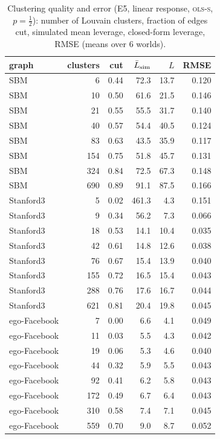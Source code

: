 \begin{table}[h]\centering\footnotesize
\caption{Clustering quality and error (E5, linear response, \textsc{ols-s}, $p=\frac12$): number of Louvain clusters, fraction of edges cut, simulated mean leverage, closed-form leverage, RMSE (means over 6 worlds).}
\label{tab:clu}\begin{tabular}{lrrrrr}\toprule
graph & clusters & cut & $\bar L_{\rm sim}$ & $L$ & RMSE \\
\midrule
SBM & 6 & 0.44 & 72.3 & 13.7 & 0.120 \\
SBM & 10 & 0.50 & 61.6 & 21.5 & 0.146 \\
SBM & 21 & 0.55 & 55.5 & 31.7 & 0.140 \\
SBM & 40 & 0.57 & 54.4 & 40.5 & 0.124 \\
SBM & 83 & 0.63 & 43.5 & 35.9 & 0.117 \\
SBM & 154 & 0.75 & 51.8 & 45.7 & 0.131 \\
SBM & 324 & 0.84 & 72.5 & 67.3 & 0.148 \\
SBM & 690 & 0.89 & 91.1 & 87.5 & 0.166 \\
Stanford3 & 5 & 0.02 & 461.3 & 4.3 & 0.151 \\
Stanford3 & 9 & 0.34 & 56.2 & 7.3 & 0.066 \\
Stanford3 & 18 & 0.53 & 14.1 & 10.4 & 0.035 \\
Stanford3 & 42 & 0.61 & 14.8 & 12.6 & 0.038 \\
Stanford3 & 76 & 0.67 & 15.4 & 13.9 & 0.040 \\
Stanford3 & 155 & 0.72 & 16.5 & 15.4 & 0.043 \\
Stanford3 & 288 & 0.76 & 17.6 & 16.7 & 0.044 \\
Stanford3 & 621 & 0.81 & 20.4 & 19.8 & 0.045 \\
ego-Facebook & 7 & 0.00 & 6.6 & 4.1 & 0.049 \\
ego-Facebook & 11 & 0.03 & 5.5 & 4.3 & 0.042 \\
ego-Facebook & 19 & 0.06 & 5.3 & 4.6 & 0.040 \\
ego-Facebook & 44 & 0.32 & 5.9 & 5.5 & 0.043 \\
ego-Facebook & 92 & 0.41 & 6.2 & 5.8 & 0.043 \\
ego-Facebook & 172 & 0.49 & 6.7 & 6.4 & 0.043 \\
ego-Facebook & 310 & 0.58 & 7.4 & 7.1 & 0.045 \\
ego-Facebook & 559 & 0.70 & 9.0 & 8.7 & 0.052 \\
\bottomrule\end{tabular}\end{table}
